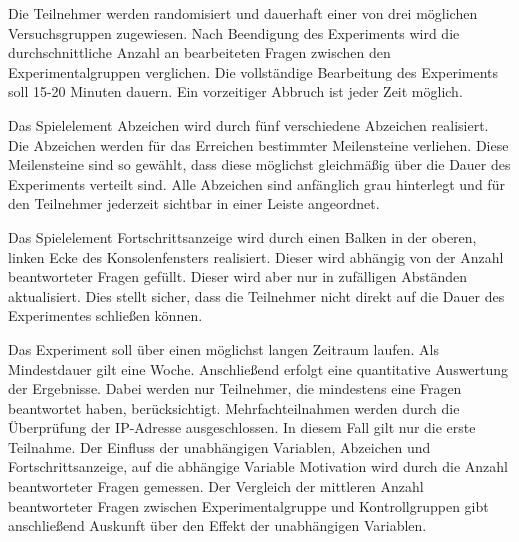 \documentclass[
    a4paper,
    doc,
    12pt,
    natbib,
]{apa6}
\begin{document}
Die Teilnehmer werden randomisiert und dauerhaft einer von drei möglichen Versuchsgruppen zugewiesen. Nach Beendigung des Experiments wird die durchschnittliche Anzahl an  bearbeiteten Fragen zwischen den Experimentalgruppen verglichen. Die vollständige Bearbeitung des Experiments soll 15-20 Minuten dauern. Ein vorzeitiger Abbruch ist jeder Zeit möglich.

Das Spielelement Abzeichen wird durch fünf verschiedene Abzeichen realisiert. Die Abzeichen werden für das Erreichen bestimmter Meilensteine verliehen. Diese Meilensteine sind so gewählt, dass diese möglichst gleichmäßig über die Dauer des Experiments verteilt sind. Alle Abzeichen sind anfänglich grau hinterlegt und für den Teilnehmer jederzeit sichtbar in einer Leiste angeordnet.

Das Spielelement Fortschrittsanzeige wird durch einen Balken in der oberen, linken Ecke des Konsolenfensters realisiert. Dieser wird abhängig von der Anzahl beantworteter Fragen gefüllt. Dieser wird aber nur in zufälligen Abständen aktualisiert. Dies stellt sicher, dass die Teilnehmer nicht direkt auf die Dauer des Experimentes schließen können.

Das Experiment soll über einen möglichst langen Zeitraum laufen. Als Mindestdauer gilt eine Woche. Anschließend erfolgt eine quantitative Auswertung der Ergebnisse. Dabei werden nur Teilnehmer, die mindestens eine Fragen beantwortet haben, berücksichtigt. Mehrfachteilnahmen werden durch die Überprüfung der IP-Adresse ausgeschlossen. In diesem Fall gilt nur die erste Teilnahme. Der Einfluss der unabhängigen Variablen, Abzeichen und Fortschrittsanzeige, auf die abhängige Variable Motivation wird durch die Anzahl beantworteter Fragen gemessen. Der Vergleich der mittleren Anzahl beantworteter Fragen zwischen Experimentalgruppe und Kontrollgruppen gibt anschließend Auskunft über den Effekt der unabhängigen Variablen.




\end{document}
